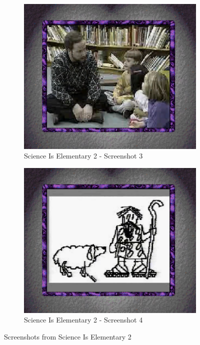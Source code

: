 \begin{figure}[H]
    \begin{subfigure}{0.45\textwidth}
        \centering
        \includegraphics[width=\linewidth]{Games/ScienceIsElementary/Images/ScienceIsElementary2Image3.png}
        \caption{Science Is Elementary 2 - Screenshot 3}
    \end{subfigure}
    \begin{subfigure}{0.45\textwidth}
        \centering
        \includegraphics[width=\linewidth]{Games/ScienceIsElementary/Images/ScienceIsElementary2Image4.png}
        \caption{Science Is Elementary 2 - Screenshot 4}
    \end{subfigure}
    \caption{Screenshots from Science Is Elementary 2}
\end{figure}